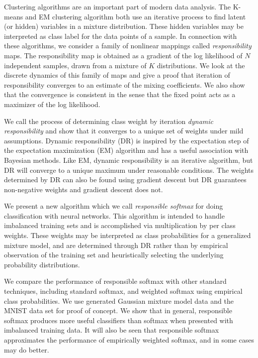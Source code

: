 

Clustering algorithms are an important part of modern data analysis.  The K-means and EM clustering algorithm both use an iterative process to find latent (or hidden) variables in a mixture distribution.  These hidden variables may be interpreted as class label for the data points of a sample.  In connection with these algorithms, we consider a family of nonlinear mappings called \textit{responsibility} maps. The responsibility map is obtained as a gradient of the log likelihood of $N$ independent samples, drawn from a mixture of $K$ distributions.  We look at the discrete dynamics of this family of maps and give a proof that iteration of responsibility converges to an estimate of the mixing coefficients.  We also show that the convergence is consistent in the sense that the fixed point acts as a maximizer of the log likelihood.

We call the process of determining class weight by iteration \textit{dynamic responsibility} and show that it converges to a unique set of weights under mild assumptions. Dynamic responsibility (DR) is inspired by the expectation step of the expectation maximization (EM) algorithm and has a useful association with Bayesian methods.  Like EM, dynamic responsibility is an iterative algorithm, but DR will converge to a unique maximum under reasonable conditions.  The weights determined by DR can also be found using gradient descent but DR guarantees non-negative weights and gradient descent does not.

We present a new algorithm which we call \textit{responsible softmax} for doing classification with neural networks.  This algorithm is intended to handle imbalanced training sets and is accomplished via multiplication by per class weights.  These weights may be interpreted as class probabilities for a generalized mixture model, and are determined through DR rather than by empirical observation of the training set and heuristically selecting the underlying probability distributions.

We compare the performance of responsible softmax with other standard techniques, including standard softmax, and weighted softmax using empirical class probabilities.  We use generated Gaussian mixture model data and the MNIST data set for proof of concept.  We show that in general, responsible softmax produces more useful classifiers than softmax when presented with imbalanced training data.  It will also be seen that responsible softmax approximates the performance of empirically weighted softmax, and in some cases may do better.